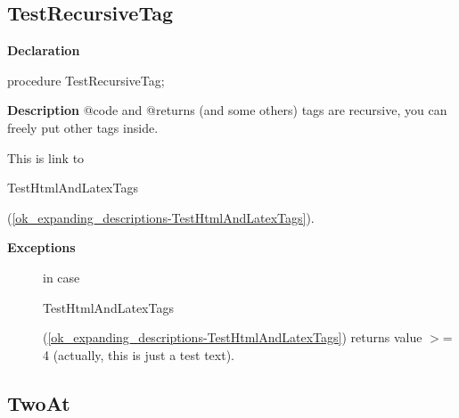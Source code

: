 \documentclass{report}
\newif\ifpdf
\begin{document}
\subsection*{TestRecursiveTag}
\fi
\label{ok_expanding_descriptions-TestRecursiveTag}
\begin{list}{}{
\setlength{\itemindent}{0cm}
\setlength{\listparindent}{0cm}
\setlength{\leftmargin}{\evensidemargin}
\addtolength{\leftmargin}{\tmplength}
\settowidth{\labelsep}{X}
\addtolength{\leftmargin}{\labelsep}
\setlength{\labelwidth}{\tmplength}
}
\item[\textbf{Declaration}\hfill]
\ifpdf
\begin{flushleft}
\fi
\begin{ttfamily}
procedure TestRecursiveTag;\end{ttfamily}

\ifpdf
\end{flushleft}
\fi

\par
\item[\textbf{Description}]
@code and @returns (and some others) tags are recursive, you can freely put other tags inside.

\begin{ttfamily}This is link to \begin{ttfamily}TestHtmlAndLatexTags\end{ttfamily}(\ref{ok_expanding_descriptions-TestHtmlAndLatexTags}).\end{ttfamily}

\par
\item[\textbf{Exceptions}]
\begin{description}
\item[\begin{ttfamily}EFoo\end{ttfamily}(\ref{ok_expanding_descriptions.EFoo})] in case \begin{ttfamily}TestHtmlAndLatexTags\end{ttfamily}(\ref{ok_expanding_descriptions-TestHtmlAndLatexTags}) returns value {$>$}= 4 (actually, this is just a test text).
\end{description}


\end{list}
\ifpdf
\subsection*{\large{\textbf{TwoAt}}\normalsize\hspace{1ex}\hrulefill}
\else
\end{document}
